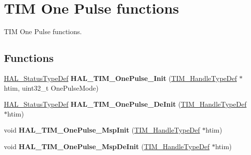 \hypertarget{group___t_i_m___exported___functions___group5}{}\section{T\+IM One Pulse functions}
\label{group___t_i_m___exported___functions___group5}


T\+IM One Pulse functions.  


\subsection*{Functions}
\begin{DoxyCompactItemize}
\item 
\mbox{\label{group___t_i_m___exported___functions___group5_ga476d67a220c23ebdc69fac7b09dbaa72}} 
\mbox{\hyperlink{stm32f7xx__hal__def_8h_a63c0679d1cb8b8c684fbb0632743478f}{H\+A\+L\+\_\+\+Status\+Type\+Def}} {\bfseries H\+A\+L\+\_\+\+T\+I\+M\+\_\+\+One\+Pulse\+\_\+\+Init} (\mbox{\hyperlink{struct_t_i_m___handle_type_def}{T\+I\+M\+\_\+\+Handle\+Type\+Def}} $\ast$htim, uint32\+\_\+t One\+Pulse\+Mode)
\item 
\mbox{\label{group___t_i_m___exported___functions___group5_gae60b468b11199522c6c83a943439c7b7}} 
\mbox{\hyperlink{stm32f7xx__hal__def_8h_a63c0679d1cb8b8c684fbb0632743478f}{H\+A\+L\+\_\+\+Status\+Type\+Def}} {\bfseries H\+A\+L\+\_\+\+T\+I\+M\+\_\+\+One\+Pulse\+\_\+\+De\+Init} (\mbox{\hyperlink{struct_t_i_m___handle_type_def}{T\+I\+M\+\_\+\+Handle\+Type\+Def}} $\ast$htim)
\item 
\mbox{\label{group___t_i_m___exported___functions___group5_ga6579726753cb2b769a21d10bec75219f}} 
void {\bfseries H\+A\+L\+\_\+\+T\+I\+M\+\_\+\+One\+Pulse\+\_\+\+Msp\+Init} (\mbox{\hyperlink{struct_t_i_m___handle_type_def}{T\+I\+M\+\_\+\+Handle\+Type\+Def}} $\ast$htim)
\item 
\mbox{\label{group___t_i_m___exported___functions___group5_ga9b73c7135e8348613f30f3a4d84478e7}} 
void {\bfseries H\+A\+L\+\_\+\+T\+I\+M\+\_\+\+One\+Pulse\+\_\+\+Msp\+De\+Init} (\mbox{\hyperlink{struct_t_i_m___handle_type_def}{T\+I\+M\+\_\+\+Handle\+Type\+Def}} $\ast$htim)

\end{DoxyCompactItemize}
